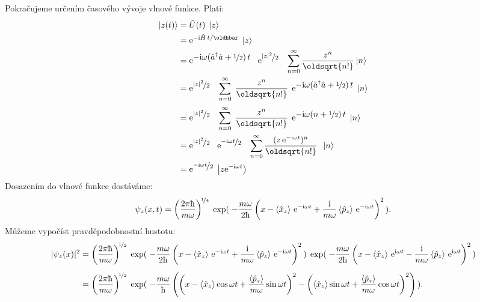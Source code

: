 \documentclass[10pt,a4paper]{article}
\newcommand{\const}[1]{\text{#1}}
\newcommand{\ket}[1]{\left| #1 \right>}
\newcommand{\e}[1]{\const{e}^{#1}}
\renewcommand{\i}{\const{i}}
\begin{document}
Pokračujeme určením časového vývoje vlnové funkce. Platí:
\begin{align*}
    \ket{z(t)} &= \hat{U}(t) \; \ket{z}
    \\
    &= \e{-\i\hat{H}\,t/\oldhbar} \; \ket{z}
    \\
    &= \e{\displaystyle -\i\omega(\hat{a}^\dagger \hat{a} + \nicefrac{1}{2}) \, t} \;\;\; \e{\displaystyle \nicefrac{|z|^2}{2}} \;\;\; \sum_{n=0}^\infty \frac{z^n}{\oldsqrt{n!}} \ket{n}
    \\
    &= \e{\displaystyle \nicefrac{|z|^2}{2}} \;\;\; \sum_{n=0}^\infty \; \frac{z^n}{\oldsqrt{n!}} \;\, \e{\displaystyle -\i\omega(\hat{a}^\dagger \hat{a} + \nicefrac{1}{2}) \, t} \; \ket{n}
    \\[2pt]
    &= \e{\displaystyle \nicefrac{|z|^2}{2}} \;\;\; \sum_{n=0}^\infty \; \frac{z^n}{\oldsqrt{n!}} \;\, \e{\displaystyle -\i\omega(n + \nicefrac{1}{2}) \, t}  \; \ket{n}
    \\
    &= \e{\displaystyle \nicefrac{|z|^2}{2}} \;\;\; \e{\displaystyle \nicefrac{-\i\omega t}{2}} \;\;\; \sum_{n=0}^\infty \frac{(z \, \e{-\i\omega t})^n}{\oldsqrt{n!}} \;\; \ket{n}
    \\
    &= \e{\displaystyle \nicefrac{-\i\omega t}{2}} \; \ket{z\e{-\i\omega t}}
\end{align*}
Dosazením do vlnové funkce dostáváme:
\begin{align*}
    \psi_z(x, t) = \left( \frac{2\pi\hbar}{m\omega} \right)^{\!\nicefrac{1}{4}} \; \exp ( \; { -\frac{m\omega}{2\hbar} \left( x - \left< \hat{x}_z \right> \, \e{-\i\omega t} + \frac{\i}{m\omega} \left< \hat{p}_z \right> \, \e{-\i\omega t} \right)^2 } \, ).
\end{align*}
Můžeme vypočíst pravděpodobnostní hustotu:
\begin{align*}
    |\psi_z(x)|^2 &= \left( \frac{2\pi\hbar}{m\omega} \right)^{\!\nicefrac{1}{2}} \; \exp ( \; { -\frac{m\omega}{2\hbar} \left( x - \left< \hat{x}_z \right> \, \e{-\i\omega t} + \frac{\i}{m\omega} \left< \hat{p}_z \right> \, \e{-\i\omega t} \right)^2 } \, ) \; \exp ( \; { -\frac{m\omega}{2\hbar} \left( x - \left< \hat{x}_z \right> \, \e{\i\omega t} - \frac{\i}{m\omega} \left< \hat{p}_z \right> \, \e{\i\omega t} \right)^2 } \, )
    \\[5pt]
    &= \left( \frac{2\pi\hbar}{m\omega} \right)^{\!\nicefrac{1}{2}} \; \exp ( \; -\frac{m\omega}{\hbar} \left(
        \left( x - \left< \hat{x}_z \right> \cos \omega t + \frac{\left< \hat{p}_z \right>}{m\omega} \sin \omega t \right)^2
        - \left( \left< \hat{x}_z \right> \sin \omega t + \frac{\left< \hat{p}_z \right>}{m\omega} \cos \omega t \right)^2
    \right) \, ).
\end{align*}
\end{document}

